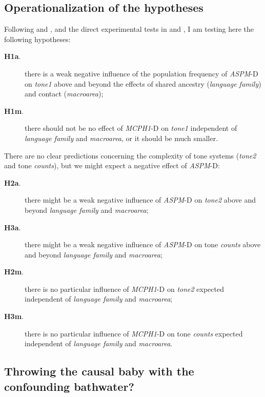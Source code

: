 \documentclass[twoside,twocolumn]{article}
\begin{document}
\subsection{Operationalization of the hypotheses}

Following \citet{dediu_ladd_2007} and \citet{ladd_bioling_2008}, and the direct experimental tests in \citet{wong_plosone_2012} and \citet{wong_sciadv_2020}, I am testing here the following hypotheses:

\begin{description}
  \item[\textbf{H1a}.] there is a weak negative influence of the population frequency of \textit{ASPM}-D on \textit{tone1} above and beyond the effects of shared ancestry (\textit{language family}) and contact (\textit{macroarea});
  \item[\textbf{H1m}.] there should not be no effect of \textit{MCPH1}-D on \textit{tone1} independent of \textit{language family} and \textit{macroarea}, or it should be much smaller.
\end{description}

There are no clear predictions concerning the complexity of tone systems (\textit{tone2} and tone \textit{counts}), but we might expect a negative effect of \textit{ASPM}-D:

\begin{description}
  \item[\textbf{H2a}.] there might be a weak negative influence of \textit{ASPM}-D on \textit{tone2} above and beyond \textit{language family} and \textit{macroarea};
  \item[\textbf{H3a}.] there might be a weak negative influence of \textit{ASPM}-D on tone \textit{counts} above and beyond \textit{language family} and \textit{macroarea};
  \item[\textbf{H2m}.] there is no particular influence of \textit{MCPH1}-D on \textit{tone2} expected independent of \textit{language family} and \textit{macroarea};
  \item[\textbf{H3m}.] there is no particular influence of \textit{MCPH1}-D on tone \textit{counts} expected independent of \textit{language family} and \textit{macroarea}.
\end{description}


\subsection{Throwing the causal baby with the confounding bathwater?}
\end{document}
